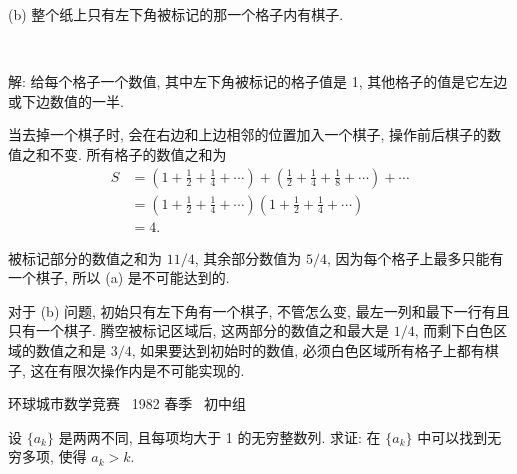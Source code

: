 (b) 整个纸上只有左下角被标记的那一个格子内有棋子.

~

解: 给每个格子一个数值, 其中左下角被标记的格子值是 1, 其他格子的值是它左边或下边数值的一半. 
\begin{figure*}[htbp]
\centering
{}
\end{figure*}

当去掉一个棋子时, 会在右边和上边相邻的位置加入一个棋子, 操作前后棋子的数值之和不变. 所有格子的数值之和为
\begin{align*} 
S &= \left(1+\frac{1}{2} + \frac{1}{4} + \cdots \right) + \left(\frac{1}{2} + \frac{1}{4} + \frac{1}{8} + \cdots \right) + \cdots \\
	&= \left( 1+\frac{1}{2} + \frac{1}{4} + \cdots \right) \left( 1+\frac{1}{2} + \frac{1}{4} + \cdots \right) \\
	&= 4.
\end{align*}

被标记部分的数值之和为 $ 11/4 $, 其余部分数值为 $ 5/4 $, 因为每个格子上最多只能有一个棋子, 所以 (a) 是不可能达到的.

对于 (b) 问题, 初始只有左下角有一个棋子, 不管怎么变, 最左一列和最下一行有且只有一个棋子. 腾空被标记区域后, 这两部分的数值之和最大是 $ 1/4 $, 而剩下白色区域的数值之和是 $ 3/4 $, 如果要达到初始时的数值, 必须白色区域所有格子上都有棋子, 这在有限次操作内是不可能实现的.


\newpage
\noindent 环球城市数学竞赛~ 1982 春季~ 初中组

设 $\{a_k\}$ 是两两不同, 且每项均大于 1 的无穷整数列. 求证: 在 $\{a_k\}$ 中可以找到无穷多项, 使得 $a_k > k$.

~

